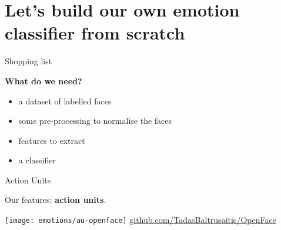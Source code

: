 \documentclass[compress,xcolor=table]{beamer}
\begin{document}


\section[Emotion classifier]{Let's build our own emotion classifier from scratch}

\begin{frame}{Shopping list}

    \begin{center}
        {\bf What do we need?}
    \end{center}

    \pause

    \begin{itemize}
        \item<+-> a dataset of labelled faces
        \item<+-> some pre-processing to normalise the faces
        \item<+-> features to extract
        \item<+-> a classifier
    \end{itemize}
\end{frame}



\begin{frame}{Action Units}
    \begin{center}
        Our features: \textbf{action units}.

        \texttt{[image: emotions/au-openface]}
        \vspace{2em}
        \href{https://github.com/TadasBaltrusaitis/OpenFace}{github.com/TadasBaltrusaitis/OpenFace}

    \end{center}
\end{frame}




\end{document}
